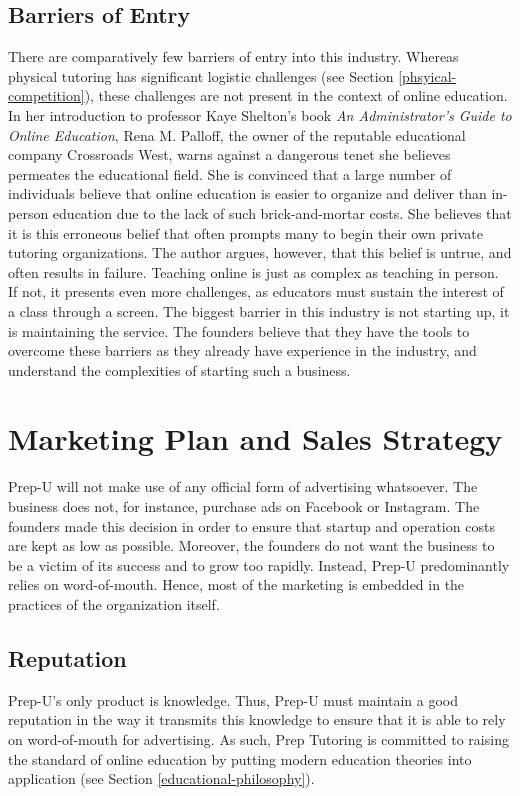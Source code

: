 \documentclass{business}
\begin{document}
    \subsection{Barriers of Entry}
    There are comparatively few barriers of entry into this industry. Whereas physical tutoring has significant logistic challenges (see Section \ref{phsyical-competition}), these challenges are not present in the context of online education. In her introduction to professor Kaye Shelton’s book \emph{An Administrator’s Guide to Online Education}, Rena M. Palloff, the owner of the reputable educational company Crossroads West, warns against a dangerous tenet she believes permeates the educational field. She is convinced that a large number of individuals believe that online education is easier to organize and deliver than in-person education due to the lack of such brick-and-mortar costs. She believes that it is this erroneous belief that often prompts many to begin their own private tutoring organizations. The author argues, however, that this belief is untrue, and often results in failure. \cite{Shelton2005} Teaching online is just as complex as teaching in person. If not, it presents even more challenges, as educators must sustain the interest of a class through a screen. The biggest barrier in this industry is not starting up, it is maintaining the service. The founders believe that they have the tools to overcome these barriers as they already have experience in the industry, and understand the complexities of starting such a business.
    \section{Marketing Plan and Sales Strategy}\label{marketing-and-sales}
    Prep-U will not make use of any official form of advertising whatsoever. The business does not, for instance, purchase ads on Facebook or Instagram. The founders made this decision in order to ensure that startup and operation costs are kept as low as possible. Moreover, the founders do not want the business to be a victim of its success and to grow too rapidly. Instead, Prep-U predominantly relies on word-of-mouth. Hence, most of the marketing is embedded in the practices of the organization itself.
    \subsection{Reputation}
    Prep-U’s only product is knowledge. Thus, Prep-U must maintain a good reputation in the way it transmits this knowledge to ensure that it is able to rely on word-of-mouth for advertising. As such, Prep Tutoring is committed to raising the standard of online education by putting modern education theories into application (see Section \ref{educational-philosophy}). 
\end{document}
